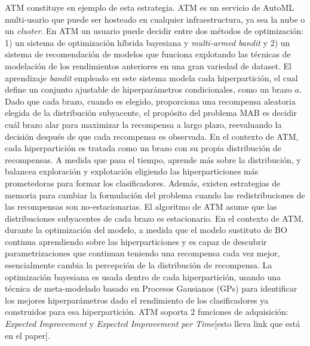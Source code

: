 ATM \cite{swearingen2017atm} constituye en ejemplo de esta estrategia. ATM es un servicio de AutoML multi-usario que puede ser hosteado en cualquier infraestructura, ya sea la nube o un \textit{cluster}. En ATM un usuario puede decidir entre dos métodos de optimización: 1) un sistema de optimización híbrida bayesiana y \textit{multi-armed bandit} y 2) un sistema de recomendación de modelos que funciona explotando las técnicas de modelación de los rendimientos anteriores en una gran variedad de dataset. El aprendizaje \textit{bandit} empleado en este sistema modela cada hiperpartición, el cual define un conjunto ajustable de hiperparámetros condicionales, como un brazo $a$. Dado que cada brazo, cuando es elegido, proporciona una recompensa aleatoria elegida de la distribución subyacente, el propósito del problema MAB es decidir cuál brazo alar para maximizar la recompensa a largo plazo, reevaluando la decisión después de que cada recompensa es observada. En el contexto de ATM, cada hiperpartición es tratada como un brazo con su propia distribución de recompensas. A medida que pasa el tiempo, aprende más sobre la distribución, y balancea exploración y explotación eligiendo las hiperparticiones más prometedoras para formar los clasificadores. Además, existen estrategias de memoria para cambiar la formulación del problema cuando las redistribuciones de las recompensas son no-estacionarias. El algoritmo de ATM asume que las distribuciones subyacentes de cada brazo es estacionario. En el contexto de ATM, durante la optimización del modelo, a medida que el modelo sustituto de BO continua aprendiendo sobre las hiperparticiones y es capaz de descubrir parametrizaciones que continuan teniendo una recompensa cada vez mejor, esencialmente cambia la percepción de la distribución de recompensa. La optimización bayesiana es usada dentro de cada hiperpartición, usando una técnica de meta-modelado basado en Procesos Gausianos (GPs) para identificar los mejores hiperparámetros dado el rendimiento de los clasificadores ya construidos para esa hiperpartición. ATM soporta 2 funciones de adquisición: \textit{Expected Improvement} y \textit{Expected Improvement per Time}[esto lleva link que está en el paper].

